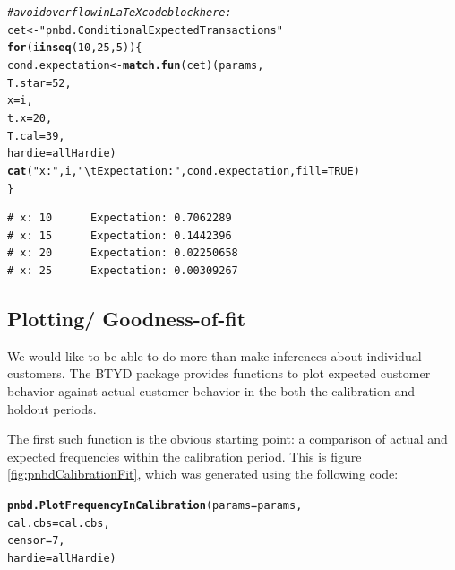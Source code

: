 \documentclass[10pt, letterpaper, onecolumn, oneside, final]{article}\usepackage[]{graphicx}\usepackage[]{color}
\makeatletter
\newcommand{\hlnum}[1]{\textcolor[rgb]{0.686,0.059,0.569}{#1}}%
\newcommand{\hlstr}[1]{\textcolor[rgb]{0.192,0.494,0.8}{#1}}%
\newcommand{\hlcom}[1]{\textcolor[rgb]{0.678,0.584,0.686}{\textit{#1}}}%
\newcommand{\hlstd}[1]{\textcolor[rgb]{0.345,0.345,0.345}{#1}}%
\newcommand{\hlkwa}[1]{\textcolor[rgb]{0.161,0.373,0.58}{\textbf{#1}}}%
\newcommand{\hlkwb}[1]{\textcolor[rgb]{0.69,0.353,0.396}{#1}}%
\newcommand{\hlkwc}[1]{\textcolor[rgb]{0.333,0.667,0.333}{#1}}%
\newcommand{\hlkwd}[1]{\textcolor[rgb]{0.737,0.353,0.396}{\textbf{#1}}}%
\newenvironment{kframe}{%
 \def\at@end@of@kframe{}%
 \ifinner\ifhmode%
  \def\at@end@of@kframe{\end{minipage}}%
  \begin{minipage}{\columnwidth}%
 \fi\fi%
 \def\FrameCommand##1{\hskip\@totalleftmargin \hskip-\fboxsep
 \colorbox{shadecolor}{##1}\hskip-\fboxsep
     \hskip-\linewidth \hskip-\@totalleftmargin \hskip\columnwidth}%
 \MakeFramed {\advance\hsize-\width
   \@totalleftmargin\z@ \linewidth\hsize
   \@setminipage}}%
 {\par\unskip\endMakeFramed%
 \at@end@of@kframe}
\newenvironment{knitrout}{}{} %
\makeatother
\begin{document}
\begin{knitrout}
\color{fgcolor}\begin{kframe}
\begin{alltt}
\hlcom{# avoid overflow in LaTeX code block here:}
\hlstd{cet} \hlkwb{<-} \hlstr{"pnbd.ConditionalExpectedTransactions"}
\hlkwa{for} \hlstd{(i} \hlkwa{in} \hlkwd{seq}\hlstd{(}\hlnum{10}\hlstd{,} \hlnum{25}\hlstd{,} \hlnum{5}\hlstd{))\{}
  \hlstd{cond.expectation} \hlkwb{<-} \hlkwd{match.fun}\hlstd{(cet)(params,}
                                     \hlkwc{T.star} \hlstd{=} \hlnum{52}\hlstd{,}
                                     \hlkwc{x} \hlstd{= i,}
                                     \hlkwc{t.x} \hlstd{=} \hlnum{20}\hlstd{,}
                                     \hlkwc{T.cal} \hlstd{=} \hlnum{39}\hlstd{,}
                                     \hlkwc{hardie} \hlstd{= allHardie)}
  \hlkwd{cat} \hlstd{(}\hlstr{"x:"}\hlstd{,i,}\hlstr{"\textbackslash{}t Expectation:"}\hlstd{,cond.expectation,} \hlkwc{fill} \hlstd{=} \hlnum{TRUE}\hlstd{)}
\hlstd{\}}
\end{alltt}
\begin{verbatim}
# x: 10 	 Expectation: 0.7062289
# x: 15 	 Expectation: 0.1442396
# x: 20 	 Expectation: 0.02250658
# x: 25 	 Expectation: 0.00309267
\end{verbatim}
\end{kframe}
\end{knitrout}

\subsection{Plotting/ Goodness-of-fit}
\label{subsec:pnbdPlotting}
We would like to be able to do more than make inferences about
individual customers. The BTYD package provides functions to plot
expected customer behavior against actual customer behavior in the
both the calibration and holdout periods.

The first such function is the obvious starting point: a comparison of
actual and expected frequencies within the calibration period. This is
figure \ref{fig:pnbdCalibrationFit}, which was generated using the
following code:

\begin{knitrout}
\color{fgcolor}\begin{kframe}
\begin{alltt}
\hlkwd{pnbd.PlotFrequencyInCalibration}\hlstd{(}\hlkwc{params} \hlstd{= params,}
                                \hlkwc{cal.cbs} \hlstd{= cal.cbs,}
                                \hlkwc{censor} \hlstd{=} \hlnum{7}\hlstd{,}
                                \hlkwc{hardie} \hlstd{= allHardie)}
\end{alltt}
\end{kframe}
\end{knitrout}
\end{document}
